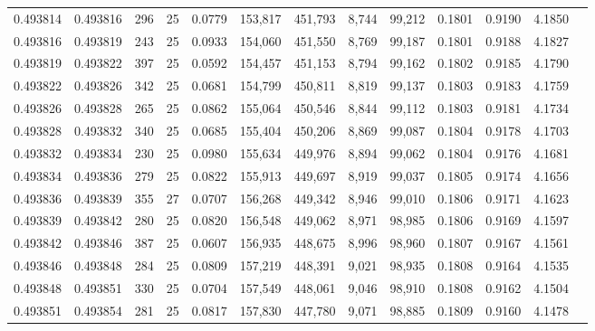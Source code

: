 \begin{tabular}{rrrrrrrrrrrrr}
0.493814 & 0.493816 &   296 &  25 &                                     0.0779 & 153,817 & 451,793 &   8,744 &  99,212 & 0.1801 & 0.9190 & 4.1850 \\
0.493816 & 0.493819 &   243 &  25 &                                     0.0933 & 154,060 & 451,550 &   8,769 &  99,187 & 0.1801 & 0.9188 & 4.1827 \\
0.493819 & 0.493822 &   397 &  25 &                                     0.0592 & 154,457 & 451,153 &   8,794 &  99,162 & 0.1802 & 0.9185 & 4.1790 \\
0.493822 & 0.493826 &   342 &  25 &                                     0.0681 & 154,799 & 450,811 &   8,819 &  99,137 & 0.1803 & 0.9183 & 4.1759 \\
0.493826 & 0.493828 &   265 &  25 &                                     0.0862 & 155,064 & 450,546 &   8,844 &  99,112 & 0.1803 & 0.9181 & 4.1734 \\
0.493828 & 0.493832 &   340 &  25 &                                     0.0685 & 155,404 & 450,206 &   8,869 &  99,087 & 0.1804 & 0.9178 & 4.1703 \\
0.493832 & 0.493834 &   230 &  25 &                                     0.0980 & 155,634 & 449,976 &   8,894 &  99,062 & 0.1804 & 0.9176 & 4.1681 \\
0.493834 & 0.493836 &   279 &  25 &                                     0.0822 & 155,913 & 449,697 &   8,919 &  99,037 & 0.1805 & 0.9174 & 4.1656 \\
0.493836 & 0.493839 &   355 &  27 &                                     0.0707 & 156,268 & 449,342 &   8,946 &  99,010 & 0.1806 & 0.9171 & 4.1623 \\
0.493839 & 0.493842 &   280 &  25 &                                     0.0820 & 156,548 & 449,062 &   8,971 &  98,985 & 0.1806 & 0.9169 & 4.1597 \\
0.493842 & 0.493846 &   387 &  25 &                                     0.0607 & 156,935 & 448,675 &   8,996 &  98,960 & 0.1807 & 0.9167 & 4.1561 \\
0.493846 & 0.493848 &   284 &  25 &                                     0.0809 & 157,219 & 448,391 &   9,021 &  98,935 & 0.1808 & 0.9164 & 4.1535 \\
0.493848 & 0.493851 &   330 &  25 &                                     0.0704 & 157,549 & 448,061 &   9,046 &  98,910 & 0.1808 & 0.9162 & 4.1504 \\
0.493851 & 0.493854 &   281 &  25 &                                     0.0817 & 157,830 & 447,780 &   9,071 &  98,885 & 0.1809 & 0.9160 & 4.1478 \\

\end{tabular}
